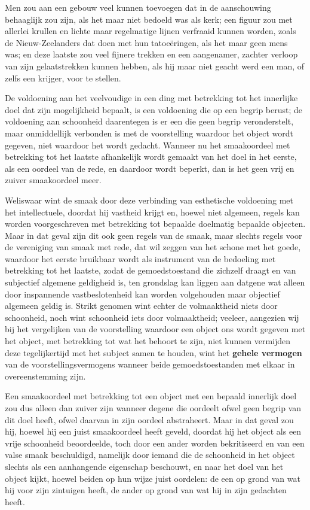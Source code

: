 Men zou aan een gebouw veel kunnen toevoegen dat in de aanschouwing behaaglijk zou zijn, als het maar niet bedoeld was als kerk; een figuur zou met allerlei krullen en lichte maar regelmatige lijnen verfraaid kunnen worden, zoals de Nieuw-Zeelanders dat doen met hun tatoeëringen, als het maar geen mens was; en deze laatste zou veel fijnere trekken en een aangenamer, zachter verloop van zijn gelaatstrekken kunnen hebben, als hij maar niet geacht werd een man, of zelfs een krijger, voor te stellen.

De voldoening aan het veelvoudige in een ding met betrekking tot het innerlijke doel dat zijn mogelijkheid bepaalt, is een voldoening die op een begrip berust; de voldoening aan schoonheid daarentegen is er een die geen begrip veronderstelt, maar onmiddellijk verbonden is met de voorstelling waardoor het object wordt gegeven, niet waardoor het wordt gedacht. Wanneer nu het smaakoordeel met betrekking tot het laatste afhankelijk wordt gemaakt van het doel in het eerste, als een oordeel van de rede, en daardoor wordt beperkt, dan is het geen vrij en zuiver smaakoordeel meer.

Weliswaar wint de smaak door deze verbinding van esthetische voldoening met het intellectuele, doordat hij vastheid krijgt en, hoewel niet algemeen, regels kan worden voorgeschreven met betrekking tot bepaalde doelmatig bepaalde objecten. Maar in dat geval zijn dit ook geen regels van de smaak, maar slechts regels voor de vereniging van smaak met rede, dat wil zeggen van het schone met het goede, waardoor het eerste bruikbaar wordt als instrument van de bedoeling met betrekking tot het laatste, zodat de gemoedstoestand die zichzelf draagt en van subjectief algemene geldigheid is, ten grondslag kan liggen aan datgene wat alleen door inspannende vastbeslotenheid kan worden volgehouden maar objectief algemeen geldig is. Strikt genomen wint echter de volmaaktheid niets door schoonheid, noch wint schoonheid iets door volmaaktheid; veeleer, aangezien wij bij het vergelijken van de voorstelling waardoor een object ons wordt gegeven met het object, met betrekking tot wat het behoort te zijn, niet kunnen vermijden deze tegelijkertijd met het subject samen te houden, wint het \textbf{gehele vermogen} van de voorstellingsvermogens wanneer beide gemoedstoestanden met elkaar in overeenstemming zijn.

Een smaakoordeel met betrekking tot een object met een bepaald innerlijk doel zou dus alleen dan zuiver zijn wanneer degene die oordeelt ofwel geen begrip van dit doel heeft, ofwel daarvan in zijn oordeel abstraheert. Maar in dat geval zou hij, hoewel hij een juist smaakoordeel heeft geveld, doordat hij het object als een vrije schoonheid beoordeelde, toch door een ander worden bekritiseerd en van een valse smaak beschuldigd, namelijk door iemand die de schoonheid in het object slechts als een aanhangende eigenschap beschouwt, en naar het doel van het object kijkt, hoewel beiden op hun wijze juist oordelen: de een op grond van wat hij voor zijn zintuigen heeft, de ander op grond van wat hij in zijn gedachten heeft.

